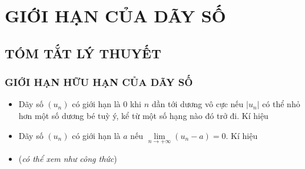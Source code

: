 \def\tenchude{GIỚI HẠN DÃY SỐ}
\setcounter{section}{14}
\section{GIỚI HẠN CỦA DÃY SỐ}
\subsection{TÓM TẮT LÝ THUYẾT}
\subsubsection{GIỚI HẠN HỮU HẠN CỦA DÃY SỐ}
\begin{itemize}
	\item [\iconMT]  Dãy số $(u_n)$ có giới hạn là $0$ khi $n$ dần tới dương vô cực nếu $|u_n|$ có thể nhỏ hơn một số dương bé tuỳ ý, kể từ một số hạng nào đó trở đi.
	Kí hiệu
	\item [\iconMT]   Dãy số $(u_n)$ có giới hạn là $a$ nếu $\lim\limits_{n \to +\infty}(u_n-a)=0$. Kí hiệu
	\item [\iconMT]  (\textit{có thể xem như công thức})
	\begin{khung}
		\begin{itemize}
		\end{itemize}
	\end{khung}
\end{itemize}
